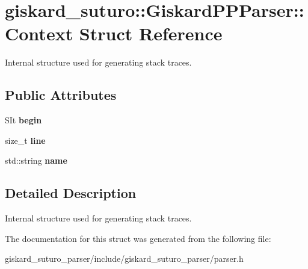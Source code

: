 \hypertarget{structgiskard__suturo_1_1GiskardPPParser_1_1Context}{\section{giskard\-\_\-suturo\-:\-:Giskard\-P\-P\-Parser\-:\-:Context Struct Reference}
\label{structgiskard__suturo_1_1GiskardPPParser_1_1Context}
}


Internal structure used for generating stack traces.  


\subsection*{Public Attributes}
\begin{DoxyCompactItemize}
\item 
\hypertarget{structgiskard__suturo_1_1GiskardPPParser_1_1Context_a33307772788f272707887e92be6e26dd}{S\-It {\bfseries begin}}\label{structgiskard__suturo_1_1GiskardPPParser_1_1Context_a33307772788f272707887e92be6e26dd}

\item 
\hypertarget{structgiskard__suturo_1_1GiskardPPParser_1_1Context_aef04bfba21f8549e278ca6cc69224d8b}{size\-\_\-t {\bfseries line}}\label{structgiskard__suturo_1_1GiskardPPParser_1_1Context_aef04bfba21f8549e278ca6cc69224d8b}

\item 
\hypertarget{structgiskard__suturo_1_1GiskardPPParser_1_1Context_aecc93fdcfcadf0049ab4fdcaac1f12f1}{std\-::string {\bfseries name}}\label{structgiskard__suturo_1_1GiskardPPParser_1_1Context_aecc93fdcfcadf0049ab4fdcaac1f12f1}

\end{DoxyCompactItemize}


\subsection{Detailed Description}
Internal structure used for generating stack traces. 

The documentation for this struct was generated from the following file\-:\begin{DoxyCompactItemize}
\item 
giskard\-\_\-suturo\-\_\-parser/include/giskard\-\_\-suturo\-\_\-parser/parser.\-h\end{DoxyCompactItemize}
